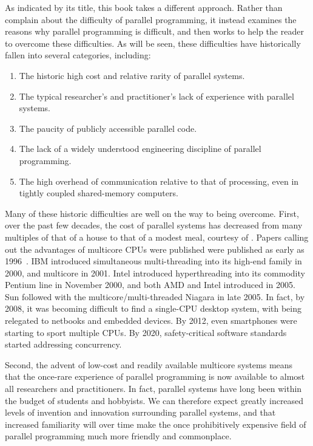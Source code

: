 As indicated by its title, this book takes a different approach.
Rather than complain about the difficulty of parallel programming,
it instead examines the reasons why parallel programming is
difficult, and then works to help the reader to overcome these
difficulties.
As will be seen, these difficulties have historically fallen into several
categories, including:

\begin{enumerate}
\item	The historic high cost and relative rarity of parallel systems.
\item	The typical researcher's and practitioner's lack of experience
	with parallel systems.
\item	The paucity of publicly accessible parallel code.
\item	The lack of a widely understood engineering discipline of
	parallel programming.
\item	The high overhead of communication relative to that of processing,
	even in tightly coupled shared-memory computers.
\end{enumerate}

Many of these historic difficulties are well on the way to being overcome.
First, over the past few decades, the cost of parallel systems
has decreased from many multiples of that of a house to that of a
modest meal, courtesy of .
Papers calling out the advantages of multicore CPUs were published
 were published
as early as 1996~\cite{Olukotun96}.
IBM introduced simultaneous multi-threading
into its high-end \Power{} family in 2000, and multicore in 2001.
Intel introduced hyperthreading into its commodity Pentium line in
November 2000, and both AMD and Intel introduced
 in 2005.
Sun followed with the multicore/multi-threaded Niagara in late 2005.
In fact, by 2008, it was becoming difficult
to find a single-CPU desktop system, with
 being
relegated to netbooks and embedded devices.
By 2012, even smartphones were starting to sport multiple CPUs.
By 2020, safety-critical software standards started addressing
concurrency.

Second, the advent of low-cost and readily available multicore systems
means that the once-rare experience of parallel programming is
now available to almost all researchers and practitioners.
In fact, parallel systems have long been within the budget of students
and hobbyists.
We can therefore expect greatly increased levels of invention and
innovation surrounding parallel systems, and that increased familiarity
will over time make the once prohibitively expensive field of parallel
programming much more friendly and commonplace.


